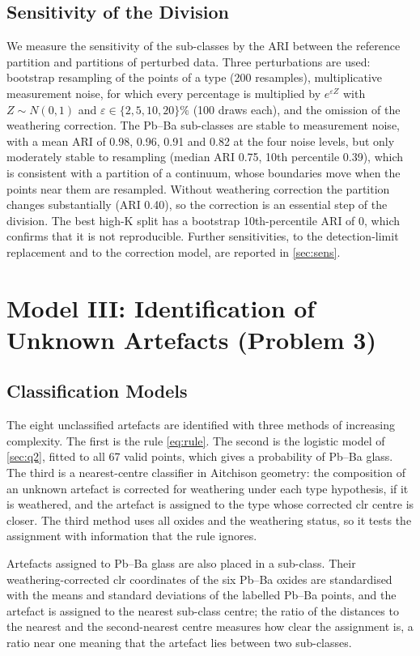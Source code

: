 \documentclass[11pt,a4paper]{article}
\begin{document}
\subsection{Sensitivity of the Division}
We measure the sensitivity of the sub-classes by the ARI between the reference partition and partitions of perturbed data.
Three perturbations are used: bootstrap resampling of the points of a type (200 resamples), multiplicative measurement noise, for which every percentage is multiplied by $e^{\varepsilon Z}$ with $Z\sim N(0,1)$ and $\varepsilon\in\{2,5,10,20\}\%$ (100 draws each), and the omission of the weathering correction.
The Pb--Ba sub-classes are stable to measurement noise, with a mean ARI of 0.98, 0.96, 0.91 and 0.82 at the four noise levels, but only moderately stable to resampling (median ARI 0.75, 10th percentile 0.39), which is consistent with a partition of a continuum, whose boundaries move when the points near them are resampled.
Without weathering correction the partition changes substantially (ARI 0.40), so the correction is an essential step of the division.
The best high-K split has a bootstrap 10th-percentile ARI of 0, which confirms that it is not reproducible.
Further sensitivities, to the detection-limit replacement and to the correction model, are reported in \cref{sec:sens}.

\section{Model III: Identification of Unknown Artefacts (Problem 3)}\label{sec:q3}

\subsection{Classification Models}
The eight unclassified artefacts are identified with three methods of increasing complexity.
The first is the rule \cref{eq:rule}.
The second is the logistic model of \cref{sec:q2}, fitted to all 67 valid points, which gives a probability of Pb--Ba glass.
The third is a nearest-centre classifier in Aitchison geometry: the composition of an unknown artefact is corrected for weathering under each type hypothesis, if it is weathered, and the artefact is assigned to the type whose corrected clr centre is closer.
The third method uses all oxides and the weathering status, so it tests the assignment with information that the rule ignores.

Artefacts assigned to Pb--Ba glass are also placed in a sub-class.
Their weathering-corrected clr coordinates of the six Pb--Ba oxides are standardised with the means and standard deviations of the labelled Pb--Ba points, and the artefact is assigned to the nearest sub-class centre; the ratio of the distances to the nearest and the second-nearest centre measures how clear the assignment is, a ratio near one meaning that the artefact lies between two sub-classes.
\end{document}
